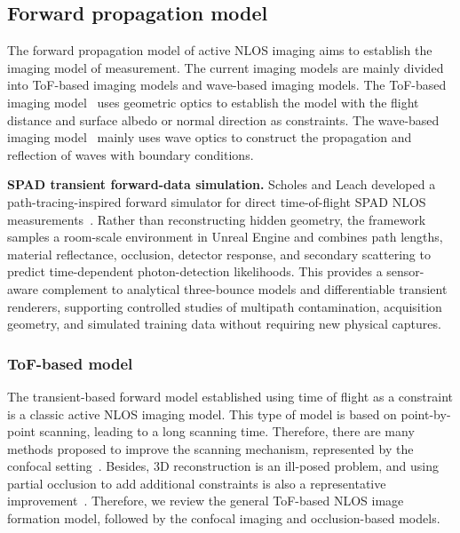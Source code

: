 \subsection{Forward propagation model}
The forward propagation model of active NLOS imaging aims to establish the imaging model of measurement. The current imaging models are mainly divided into ToF-based imaging models and wave-based imaging models. The ToF-based imaging model~\cite{otooleConfocalNonlineofsightImaging2018,veltenRecoveringThreedimensionalShape2012} uses geometric optics to establish the model with the flight distance and surface albedo or normal direction as constraints. The wave-based imaging model~\cite{Lindell:2019:Wave,liuPhasorFieldDiffraction2020} mainly uses wave optics to construct the propagation and reflection of waves with boundary conditions.

\vspace{0.8mm}
\noindent \textbf{SPAD transient forward-data simulation.}
Scholes and Leach developed a path-tracing-inspired forward simulator for direct time-of-flight SPAD NLOS measurements~\cite{scholesPathTracingSPAD2024}. Rather than reconstructing hidden geometry, the framework samples a room-scale environment in Unreal Engine and combines path lengths, material reflectance, occlusion, detector response, and secondary scattering to predict time-dependent photon-detection likelihoods. This provides a sensor-aware complement to analytical three-bounce models and differentiable transient renderers, supporting controlled studies of multipath contamination, acquisition geometry, and simulated training data without requiring new physical captures.

\subsubsection{ToF-based model}
The transient-based forward model established using time of flight as a constraint is a classic active NLOS imaging model. This type of model is based on point-by-point scanning, leading to a long scanning time. Therefore, there are many methods proposed to improve the scanning mechanism, represented by the confocal setting~\cite{otooleConfocalNonlineofsightImaging2018}. Besides, 3D reconstruction is an ill-posed problem, and using partial occlusion to add additional constraints is also a representative improvement~\cite{thrampoulidisExploitingOcclusionNonLineofSight2018}. Therefore, we review the general ToF-based NLOS image formation model, followed by the confocal imaging and occlusion-based models.

